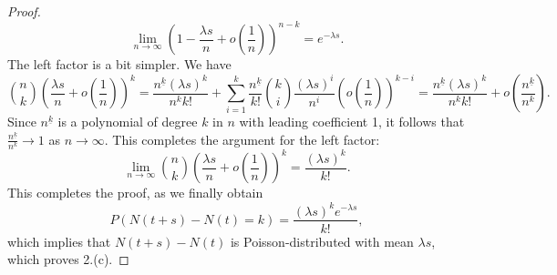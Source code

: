 \documentclass{homework}
\begin{document}
\begin{proof}
\begin{equation*}
			\lim_{n\to\infty}\left(1-\frac{\lambda s}{n} + o\left(\frac{1}{n}\right)\right)^{n-k} = e^{-\lambda s}.
		\end{equation*}
		The left factor is a bit simpler. We have
		\begin{equation*}
			\binom{n}{k}\left(\frac{\lambda s}{n} + o\left(\frac{1}{n}\right)\right)^k = \frac{n^{\underline{k}}(\lambda s)^k}{n^kk!} + \sum_{i=1}^k \frac{n^{\underline{k}}}{k!}\binom{k}{i}\frac{(\lambda s)^i}{n^i}\left(o\left(\frac{1}{n}\right)\right)^{k-i} =\frac{n^{\underline{k}}(\lambda s)^k}{n^kk!} + o\left(\frac{n^{\underline{k}}}{n^k}\right).
		\end{equation*}
		Since $n^{\underline{k}}$ is a polynomial of degree $k$ in $n$ with leading coefficient 1, it follows that $\frac{n^{\underline{k}}}{n^k} \to 1$ as $n \to \infty$. This completes the argument for the left factor:
		\begin{equation*}
			\lim_{n\to\infty}\binom{n}{k}\left(\frac{\lambda s}{n} + o\left(\frac{1}{n}\right)\right)^k = \frac{(\lambda s)^k}{k!}.
		\end{equation*}
		This completes the proof, as we finally obtain
		\begin{equation*}
			P(N(t+s) - N(t) = k) = \frac{(\lambda s)^ke^{-\lambda s}}{k!},
		\end{equation*}
		which implies that $N(t+s) - N(t)$ is Poisson-distributed with mean $\lambda s$, which proves 2.(c).
	\end{proof}
		
\end{document}
